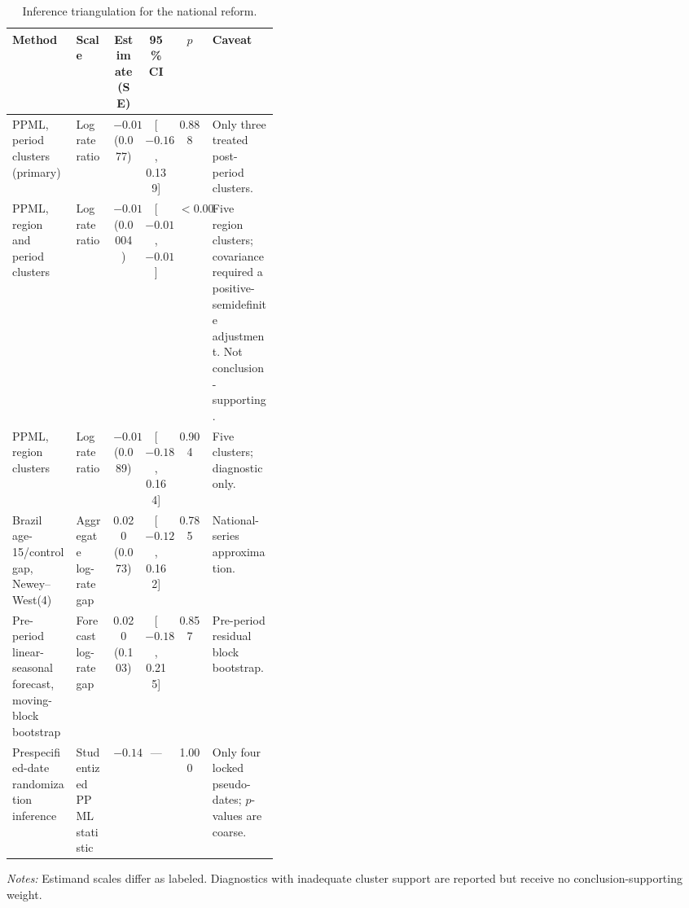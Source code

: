\begin{table}[!htbp]
\centering
\caption{Inference triangulation for the national reform.}
\label{tab:inference}
\begingroup\scriptsize
\begin{tabularx}{\linewidth}{@{}>{\raggedright\arraybackslash}p{0.24\linewidth}
>{\raggedright\arraybackslash}p{0.14\linewidth}ccc
>{\raggedright\arraybackslash}X@{}}
\toprule
Method & Scale & Estimate (SE) & 95\% CI & $p$ & Caveat \\
\midrule
PPML, period clusters (primary) & Log rate ratio & $-0.011$ (0.077) & [$-0.161$, 0.139] & 0.888 & Only three treated post-period clusters. \\
PPML, region and period clusters & Log rate ratio & $-0.011$ (0.0004) & [$-0.0115$, $-0.0101$] & $<0.001$ & Five region clusters; covariance required a positive-semidefinite adjustment. Not conclusion-supporting. \\
PPML, region clusters & Log rate ratio & $-0.011$ (0.089) & [$-0.186$, 0.164] & 0.904 & Five clusters; diagnostic only. \\
Brazil age-15/control gap, Newey--West(4) & Aggregate log-rate gap & 0.020 (0.073) & [$-0.123$, 0.162] & 0.785 & National-series approximation. \\
Pre-period linear-seasonal forecast, moving-block bootstrap & Forecast log-rate gap & 0.020 (0.103) & [$-0.185$, 0.215] & 0.857 & Pre-period residual block bootstrap. \\
Prespecified-date randomization inference & Studentized PPML statistic & $-0.141$ & --- & 1.000 & Only four locked pseudo-dates; $p$-values are coarse. \\
\bottomrule
\end{tabularx}
\par\smallskip
\footnotesize\emph{Notes:} Estimand scales differ as labeled. Diagnostics with
inadequate cluster support are reported but receive no conclusion-supporting weight.
\endgroup
\end{table}
